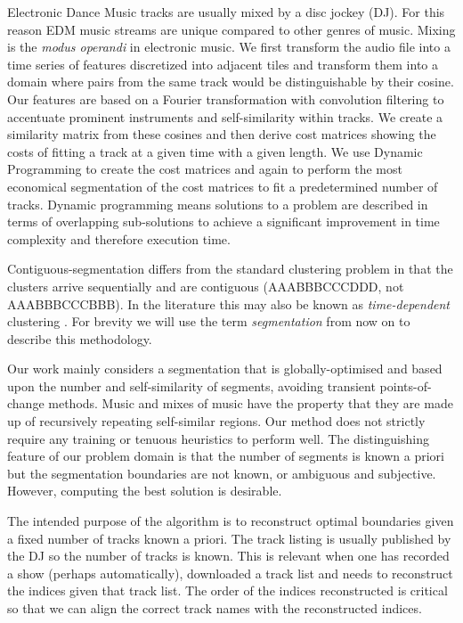\documentclass[twocolumn]{article}
\begin{document}
	Electronic Dance Music tracks are usually mixed by a disc jockey (DJ). For this reason EDM music streams are unique compared to other genres of music. Mixing is the \textit{modus operandi} in electronic music. We first transform the audio file into a time series of features discretized into adjacent tiles and transform them into a domain where pairs from the same track would be distinguishable by their cosine. Our features are based on a Fourier transformation with convolution filtering to accentuate prominent instruments and self-similarity within tracks. We create a similarity matrix from these cosines and then derive cost matrices showing the costs of fitting a track at a given time with a given length. We use Dynamic Programming to create the cost matrices and again to perform the most economical segmentation of the cost matrices to fit a predetermined number of tracks. Dynamic programming means solutions to a problem are described in terms of overlapping sub-solutions to achieve a significant improvement in time complexity and therefore execution time. 
	
	Contiguous-segmentation differs from the standard clustering problem in that the clusters arrive sequentially and are contiguous (AAABBBCCCDDD, not AAABBBCCCBBB). In the literature this may also be known as \textit{time-dependent} clustering \citep{radu}. For brevity we will use the term \textit{segmentation} from now on to describe this methodology. 
	
	Our work mainly considers a segmentation that is globally-optimised and based upon the number and self-similarity of segments, avoiding transient points-of-change methods. Music and mixes of music have the property that they are made up of recursively repeating self-similar regions. Our method does not strictly require any training or tenuous heuristics to perform well. The distinguishing feature of our problem domain is that the number of segments is known a priori but the segmentation boundaries are not known, or ambiguous and subjective. However, computing the best solution is desirable.
	
	The intended purpose of the algorithm is to reconstruct optimal boundaries given a fixed number of tracks known a priori. The track listing is usually published by the DJ so the number of tracks is known. This is relevant when one has recorded a show (perhaps automatically), downloaded a track list and needs to reconstruct the indices given that track list. The order of the indices reconstructed is critical so that we can align the correct track names with the reconstructed indices. 
	
\end{document}
